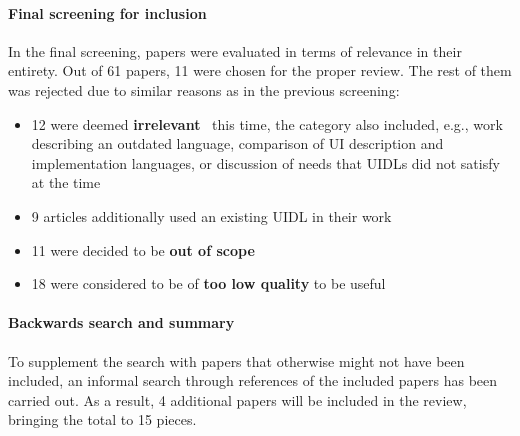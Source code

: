\paragraph{Final screening for inclusion}

In the final screening, papers were evaluated in terms of relevance in their entirety.
Out of 61 papers, 11 were chosen for the proper review.
The rest of them was rejected due to similar reasons as in the previous screening:
\begin{itemize}
    \item 12 were deemed \textbf{irrelevant} \textendash\ this time, the category also included, e.g., work describing an outdated language, comparison of UI description and implementation languages, or discussion of needs that UIDLs did not satisfy at the time
    \item 9 articles additionally used an existing UIDL in their work
    \item 11 were decided to be \textbf{out of scope}
    \item 18 were considered to be of \textbf{too low quality} to be useful
\end{itemize}

\paragraph{Backwards search and summary}

To supplement the search with papers that otherwise might not have been included, an informal search through references of the included papers has been carried out.
As a result, 4 additional papers will be included in the review, bringing the total to 15 pieces.


